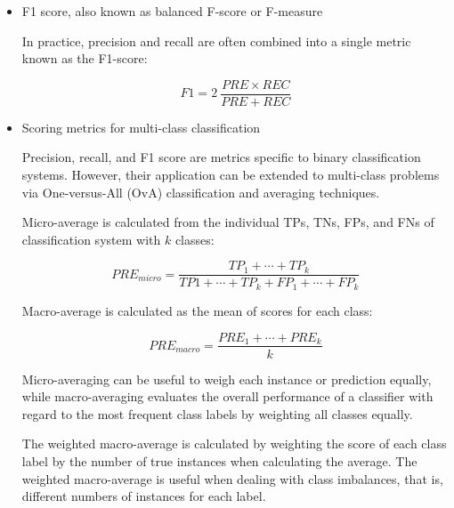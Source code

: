 \begin{itemize}
    \item F1 score, also known as balanced F-score or F-measure

    In practice, precision and recall are often combined into a single metric known as the F1-score:

    \begin{equation} \label{eq:f1_score}
        F1 = 2~\frac{PRE \times REC} {PRE + REC}
    \end{equation}

    \item Scoring metrics for multi-class classification

    Precision, recall, and F1 score are metrics specific to binary classification systems.
    However, their application can be extended to multi-class problems via One-versus-All (OvA) classification and averaging techniques.

    Micro-average is calculated from the individual TPs, TNs, FPs, and FNs of classification system with $k$ classes:

    \begin{equation} \label{eq:micro_average}
        PRE_{micro} = \frac{TP_1 + \cdots + TP_k} {TP1 + \cdots + TP_k + FP_1 + \cdots + FP_k}
    \end{equation}

    Macro-average is calculated as the mean of scores for each class:

    \begin{equation} \label{eq:macro_average}
        PRE_{macro} = \frac{PRE_1 + \cdots + PRE_k} {k}
    \end{equation}

    Micro-averaging can be useful to weigh each instance or prediction equally, while macro-averaging evaluates the overall performance of a classifier with regard to the most frequent class labels by weighting all classes equally\cite{RaschkaMirjalili2017}.

    The weighted macro-average is calculated by weighting the score of each class label by the number of true instances when calculating the average.
    The weighted macro-average is useful when dealing with class imbalances, that is, different numbers of instances for each label.

\end{itemize}


